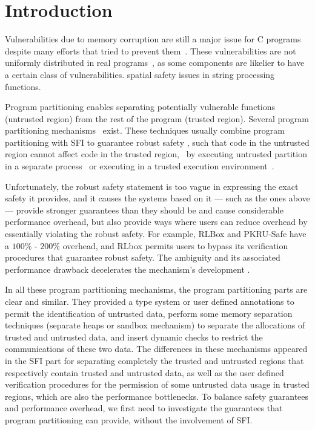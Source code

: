 \section{Introduction}\label{sec:intros}

Vulnerabilities due to memory corruption are still a major issue for C programs~\cite{cvetrend, microsoftmemsafe, Zeng:2013:SRF:2534766.2534798}  despite many efforts that tried to prevent them~\cite{song2019sanitizing}.
These vulnerabilities are not uniformly distributed in real programs~\cite{meng2021bran, du2019leopard},
as some components are likelier to have a certain class of vulnerabilities.
\eg{} spatial safety issues in string processing functions.

Program partitioning enables separating potentially vulnerable functions (untrusted region) from the rest of the program (trusted region).
Several program partitioning mechanisms~\cite{tan2017principles, brumley2004privtrans, bittau2008wedge, lind2017glamdring, liu2017ptrsplit,rlbox-paper,10.1145/3492321.3519582,privtrans,cqual-kernel-ptr,10.1145/3371100} exist.
These techniques usually combine program partitioning with SFI to guarantee robust safety \cite{10.1145/3371100}, such that code in the untrusted region cannot affect code in the trusted region,~\eg{} by executing untrusted partition in a separate process~\cite{liu2017ptrsplit} or executing in a trusted execution environment~\cite{lind2017glamdring}. 

Unfortunately, the robust safety statement is too vague in expressing the exact safety it provides, and it causes the systems based on it --- such as the ones above --- provide stronger guarantees than they should be and cause considerable performance overhead, but also provide ways where users can reduce overhead by essentially violating the robust safety.
For example, RLBox \cite{rlbox-paper} and PKRU-Safe \cite{10.1145/3492321.3519582} have a $100\%$ - $200\%$ overhead, and RLbox permits users to bypass its verification procedures that guarantee robust safety.
The ambiguity and its associated performance drawback decelerates the mechanism's development \cite{sandboxfu}.

In all these program partitioning mechanisms, the program partitioning parts are clear and similar.
They provided a type system or user defined annotations to permit the identification of untrusted data, perform some memory separation techniques (separate heaps or sandbox mechanism) to separate the allocations of trusted and untrusted data, and insert dynamic checks to restrict the communications of these two data.
The differences in these mechanisms appeared in the SFI part for separating completely the trusted and untrusted regions that respectively contain trusted and untrusted data, as well as the user defined verification procedures for the permission of some untrusted data usage in trusted regions, which are also the performance bottlenecks.
To balance safety guarantees and performance overhead, we first need to investigate the guarantees that program partitioning can provide, without the involvement of SFI.

